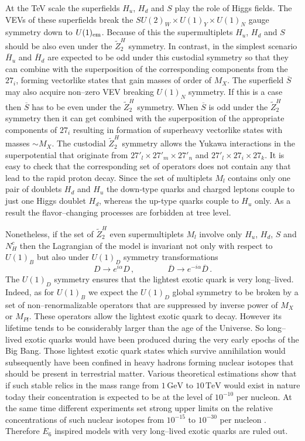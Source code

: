 \documentclass[12pt,a4paper]{article}
\newcommand{\be}{\begin{equation}}
\newcommand{\ee}{\end{equation}}
\begin{document}
At the TeV scale the superfields $H_u$, $H_d$ and $S$ play the role of
Higgs fields. The VEVs of these superfields break the $SU(2)_W\times
U(1)_Y\times U(1)_{N}$ gauge symmetry down to $U(1)_{\rm em}$.  Because of
this the supermultiplets $H_u$, $H_d$ and $S$ should be also even
under the $\tilde{Z}^{H}_2$ symmetry.  In contrast, in the simplest
scenario $\overline{H}_u$ and $\overline{H}_d$ are expected to be odd
under this custodial symmetry so that they can combine with the
superposition of the corresponding components from the $27_i$, forming
vectorlike states that gain masses of order of $M_X$.  The superfield
$\overline{S}$ may also acquire non--zero VEV breaking $U(1)_{N}$
symmetry. If this is a case then $\overline{S}$ has to be even under
the $\tilde{Z}^{H}_2$ symmetry. When $\overline{S}$ is odd under the
$\tilde{Z}^{H}_2$ symmetry then it can get combined with the
superposition of the appropriate components of $27_i$ resulting in
formation of superheavy vectorlike states with masses $\sim M_X$.  The
custodial $\tilde{Z}^{H}_2$ symmetry allows the Yukawa interactions in
the superpotential that originate from $27'_l \times 27'_m \times
27'_n$ and $27'_l \times 27_i \times 27_k$. It is easy to check that
the corresponding set of operators does not contain any that lead to
the rapid proton decay. Since the set of multiplets $M_{l}$ contains
only one pair of doublets $H_d$ and $H_u$ the down-type quarks and
charged leptons couple to just one Higgs doublet $H_d$, whereas the
up-type quarks couple to $H_u$ only. As a result the flavor--changing
processes are forbidden at tree level.

Nonetheless, if the set of $\tilde{Z}^{H}_2$ even supermultiplets
$M_{l}$ involve only $H_u$, $H_d$, $S$ and $N^c_H$ then the Lagrangian
of the model is invariant not only with respect to $U(1)_B$ but also
under $U(1)_D$ symmetry transformations \be D\to e^{i\alpha}
D\,,\qquad\qquad \overline{D}\to e^{-i\alpha}\overline{D}\,.
\label{hd6}
\ee
The $U(1)_D$ symmetry ensures that the lightest exotic quark is very long--lived.
Indeed, as for $U(1)_B$ we expect the $U(1)_D$ global symmetry to be broken by a 
set of non--renormalizable
operators that are suppressed by inverse power of $M_X$ or $M_{Pl}$. These operators allow the lightest
exotic quark to decay. However its lifetime tends to be considerably larger than the age of the Universe.
So long--lived exotic quarks would have been produced during the very early epochs of the Big Bang.
Those lightest exotic quark states which survive annihilation would subsequently have been confined
in heavy hadrons forming nuclear isotopes that should be present in terrestrial matter. Various theoretical
estimations \cite{43} show that if such stable relics in the mass range from $1\,\mbox{GeV}$ to $10\,\mbox{TeV}$
would exist in nature today their concentration is expected to be at the level of $10^{-10}$ per nucleon.
At the same time different experiments set strong upper limits on the relative concentrations of such
nuclear isotopes from $10^{-15}$ to $10^{-30}$ per nucleon \cite{42}. Therefore $E_6$ inspired models
with very long--lived exotic quarks are ruled out.
\end{document}
